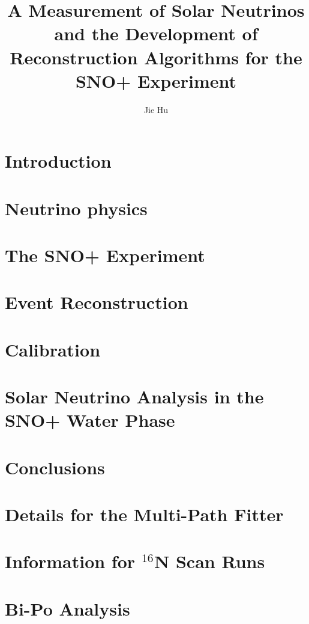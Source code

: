 \documentclass[phd,black]{PrincetonThesis}
\title{A Measurement of Solar Neutrinos and the Development of Reconstruction Algorithms for the SNO+ Experiment}
\author{Jie Hu}
\begin{document}
\begin{frontmatter}
	
\begin{thesisabstract}

\end{thesisabstract}

\begin{preface}
	
\end{preface}

\begin{acknowledgements}

\end{acknowledgements}
 
\end{frontmatter}

\cleardoublepage
\chapter{Introduction}

\chapter{Neutrino physics}

\chapter{The SNO+ Experiment}

\chapter{Event Reconstruction}

\chapter{Calibration}

\chapter{Solar Neutrino Analysis in the SNO+ Water Phase}

\chapter{Conclusions}


\cleardoublepage


\appendix
\cleardoublepage
\chapter{Details for the Multi-Path Fitter}

\chapter{Information for $^{16}$N Scan Runs}

\chapter{Bi-Po Analysis}

%
\end{document}
